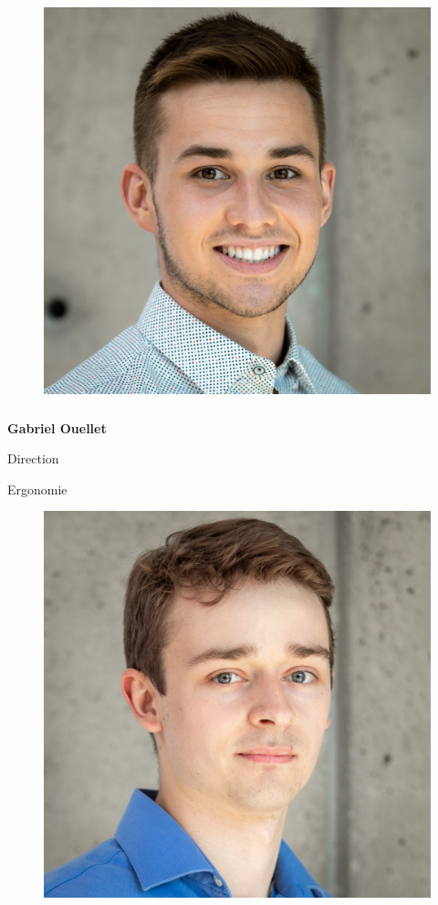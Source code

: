 \documentclass[a0paper,portrait]{baposter}
\begin{document}
\begin{poster}
{\begin{figure}
\includegraphics[width=.9\linewidth]{img/membres/Gabriel-Ouellet-3.jpg} 
\end{figure}
\subsubsection*{}
\vspace{2mm}
\textbf{Gabriel Ouellet}

Direction

Ergonomie

\begin{figure}
\includegraphics[width=.9\linewidth]{img/membres/Alexandre-Dumont-3.jpg} 
\end{figure}
}
\end{poster}
\end{document}
